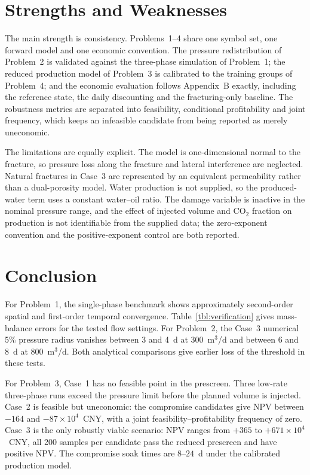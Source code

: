 \section{Strengths and Weaknesses}

The main strength is consistency. Problems~1--4 share one symbol set, one
forward model and one economic convention. The pressure redistribution of
Problem~2 is validated against the three-phase simulation of Problem~1; the
reduced production model of Problem~3 is calibrated to the training groups of
Problem~4; and the economic evaluation follows Appendix~B exactly, including
the reference state, the daily discounting and the fracturing-only baseline.
The robustness metrics are separated into feasibility, conditional
profitability and joint frequency, which keeps an infeasible candidate from
being reported as merely uneconomic.

The limitations are equally explicit. The model is one-dimensional normal to
the fracture, so pressure loss along the fracture and lateral interference are
neglected. Natural fractures in Case~3 are represented by an equivalent
permeability rather than a dual-porosity model. Water production is not
supplied, so the produced-water term uses a constant water--oil ratio. The
damage variable is inactive in the nominal pressure range, and the effect of
injected volume and CO$_2$ fraction on production is not identifiable from the
supplied data; the zero-exponent convention and the positive-exponent control
are both reported.

\section{Conclusion}

For Problem~1, the single-phase benchmark shows approximately second-order
spatial and first-order temporal convergence. Table~\ref{tbl:verification}
gives mass-balance errors for the tested flow settings. For Problem~2, the
Case~3 numerical 5\% pressure radius vanishes between 3 and 4~d at
300~m$^3$/d and between 6 and 8~d at 800~m$^3$/d. Both analytical
comparisons give earlier loss of the threshold in these tests.

For Problem~3, Case~1 has no feasible point in the prescreen. Three low-rate
three-phase runs exceed the pressure limit before the planned volume is injected. Case~2 is
feasible but uneconomic: the compromise candidates give NPV between $-164$
and $-87\times10^4$~CNY, with a joint feasibility--profitability frequency of
zero. Case~3 is the only robustly viable scenario: NPV ranges from $+365$ to
$+671\times10^4$~CNY, all 200 samples per candidate pass the reduced prescreen and have positive NPV. The compromise soak times are $8$--$24$~d under the calibrated
production model.


